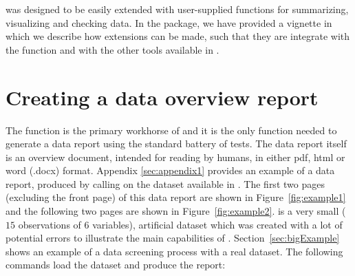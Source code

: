 \documentclass[article,shortnames]{jss}
\begin{document}
 was designed to be easily extended with user-supplied
functions for summarizing, visualizing and checking data. In the package, we have
provided a vignette in which we describe how  extensions
can be made, such that they are integrate with the
 function and with the other tools available in
.



\section{Creating a data overview report}
\label{sec:usingdataMaid}

The  function is the primary workhorse of
 and it is the only function needed to generate a data
report using the standard battery of tests. The data report itself is
an overview document, intended for reading by humans, in either pdf,
html or word (.docx) format. Appendix \ref{sec:appendix1} provides an
example of a data report, produced by calling 
on the dataset  available in . The first
two pages (excluding the front page) of this data report are shown in
Figure~\ref{fig:example1} and the following two pages are shown in
Figure~\ref{fig:example2}.  is a very small ($15$
observations of $6$ variables), artificial dataset which was created
with a lot of potential errors to illustrate the main capabilities of
. Section~\ref{sec:bigExample} shows an example of a data screening
process with a real dataset. The following commands load the dataset
and produce the report:
\end{document}

